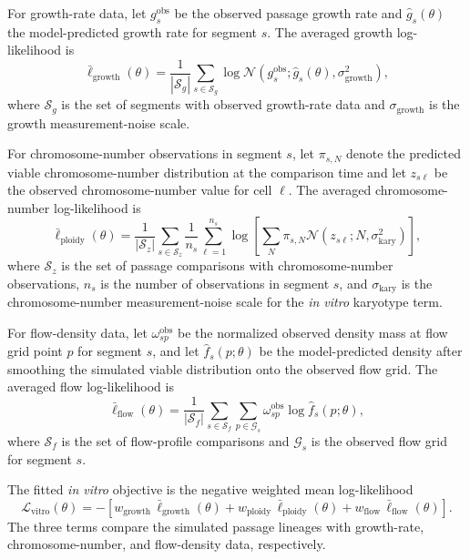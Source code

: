 \documentclass[11pt]{article}
\begin{document}
For growth-rate data, let $g_s^{\mathrm{obs}}$ be the observed passage growth rate and $\widehat g_s(\theta)$ the model-predicted growth rate for segment $s$. The averaged growth log-likelihood is
\begin{equation}
\bar\ell_{\mathrm{growth}}(\theta)
=
\frac{1}{|\mathcal S_g|}
\sum_{s\in\mathcal S_g}
\log \mathcal N\!\left(g_s^{\mathrm{obs}};\widehat g_s(\theta),\sigma_{\mathrm{growth}}^2\right),
\label{eq:appendix_invitro_growth_ll}
\end{equation}
where $\mathcal S_g$ is the set of segments with observed growth-rate data and $\sigma_{\mathrm{growth}}$ is the growth measurement-noise scale.

For chromosome-number observations in segment $s$, let $\pi_{s,N}$ denote the predicted viable chromosome-number distribution at the comparison time and let $z_{s\ell}$ be the observed chromosome-number value for cell $\ell$. The averaged chromosome-number log-likelihood is
\begin{equation}
\bar\ell_{\mathrm{ploidy}}(\theta)
=
\frac{1}{|\mathcal S_z|}
\sum_{s\in\mathcal S_z}
\frac{1}{n_s}
\sum_{\ell=1}^{n_s}
\log\left[
\sum_N \pi_{s,N}
\mathcal N\!\left(z_{s\ell};N,\sigma_{\mathrm{kary}}^2\right)
\right],
\label{eq:appendix_invitro_ploidy_ll}
\end{equation}
where $\mathcal S_z$ is the set of passage comparisons with chromosome-number observations, $n_s$ is the number of observations in segment $s$, and $\sigma_{\mathrm{kary}}$ is the chromosome-number measurement-noise scale for the \textit{in vitro} karyotype term.

For flow-density data, let $\omega^{\mathrm{obs}}_{sp}$ be the normalized observed density mass at flow grid point $p$ for segment $s$, and let $\widehat f_s(p;\theta)$ be the model-predicted density after smoothing the simulated viable distribution onto the observed flow grid. The averaged flow log-likelihood is
\begin{equation}
\bar\ell_{\mathrm{flow}}(\theta)
=
\frac{1}{|\mathcal S_f|}
\sum_{s\in\mathcal S_f}
\sum_{p\in\mathcal G_s}
\omega^{\mathrm{obs}}_{sp}
\log \widehat f_s(p;\theta),
\label{eq:appendix_invitro_flow_ll}
\end{equation}
where $\mathcal S_f$ is the set of flow-profile comparisons and $\mathcal G_s$ is the observed flow grid for segment $s$.

The fitted \textit{in vitro} objective is the negative weighted mean log-likelihood
\begin{equation}
\mathcal L_{\mathrm{vitro}}(\theta)
=
-\left[
 w_{\mathrm{growth}}\,\bar\ell_{\mathrm{growth}}(\theta)
 +w_{\mathrm{ploidy}}\,\bar\ell_{\mathrm{ploidy}}(\theta)
 +w_{\mathrm{flow}}\,\bar\ell_{\mathrm{flow}}(\theta)
\right].
\label{eq:appendix_invitro_objective}
\end{equation}
The three terms compare the simulated passage lineages with growth-rate, chromosome-number, and flow-density data, respectively.
\end{document}
